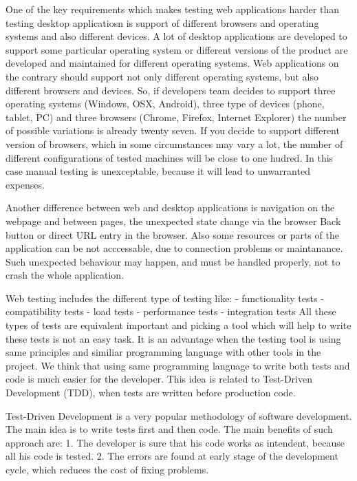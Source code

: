 		One of the key requirements which makes testing web applications harder than
		testing desktop applicatiosn is support of different browsers and operating systems and also
		different devices. A lot of desktop applications are developed to support some
		particular operating system or different versions of the product are developed
		and maintained for different operating systems. Web applications on the
		contrary should support not only different operating systems, but also
		different browsers and devices. So, if developers team decides to support
		three operating systems (Windows, OSX, Android), three type of devices (phone,
		tablet, PC) and three browsers (Chrome, Firefox, Internet Explorer) the number
		of possible variations is already twenty seven. If you decide to support
		different version of browsers, which in some circumstances may vary a lot,
		the number of different configurations of tested machines will be close to
		one hudred. In this case manual testing is unexceptable, because it will lead
		to unwarranted expenses. 
		
		Another difference between web and desktop applications is
		navigation on the webpage and between pages, the unexpected state change via
		the browser Back button or direct URL entry in the browser. Also some
		resources or parts of the application can be not acccessable, due to
		connection problems or maintanance. Such unexpected behaviour may happen, and
		must be handled properly, not to crash the whole application.

		Web testing includes the different type of testing like:
			- functionality tests
			- compatibility tests
			- load tests
			- performance tests
			- integration tests
		All these types of tests are equivalent important and picking a tool which
		will help to write these tests is not an easy task. It is an advantage when
		the testing tool is using same principles and similiar programming language
		with other tools in the project. We think that using same programming language
		to write both tests and code is much easier for the developer. This idea is
		related to Test-Driven Development (TDD), when tests are written
		before production code.
		
		Test-Driven Development is a very popular methodology of software
			development. The main idea is to write tests first and then code. The main
			benefits of such approach are:
				1. The developer is sure that his code works as intendent, because all his
				code is tested.
				2. The errors are found at early stage of the development cycle, which
				reduces the cost of fixing problems.
			
